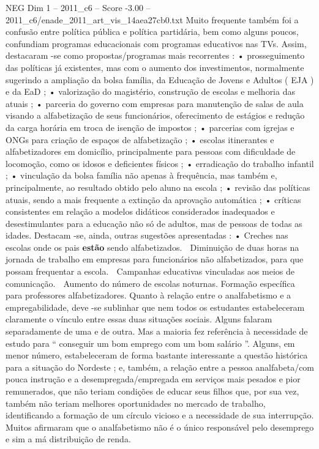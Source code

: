 \begin{textsample}{NEG Dim 1 – 2011\_c6 – Score -3.00 – 2011\_c6/enade\_2011\_art\_vis\_14aea27cb0.txt}
Muito frequente também foi a confusão entre política pública e política partidária, bem como alguns poucos, confundiam programas educacionais com programas educativos nas TVs.
Assim, destacaram -se como propostas/programas mais recorrentes : • prosseguimento das políticas já existentes, mas com o aumento dos investimentos, normalmente sugerindo a ampliação da bolsa família, da Educação de Jovens e Adultos ( EJA ) e da EaD ; • valorização do magistério, construção de escolas e melhoria das atuais ; • parceria do governo com empresas para manutenção de salas de aula visando a alfabetização de seus funcionários, oferecimento de estágios e redução da carga horária em troca de isenção de impostos ; • parcerias com igrejas e ONGs para criação de espaços de alfabetização ; • escolas itinerantes e alfabetizadores em domicílio, principalmente para pessoas com dificuldade de locomoção, como os idosos e deficientes físicos ; • erradicação do trabalho infantil ; • vinculação da bolsa família não apenas à frequência, mas também e, principalmente, ao resultado obtido pelo aluno na escola ; • revisão das políticas atuais, sendo a mais frequente a extinção da aprovação automática ; • críticas consistentes em relação a modelos didáticos considerados inadequados e desestimulantes para a educação não só de adultos, mas de pessoas de todas as idades.
Destacam -se, ainda, outras sugestões apresentadas : • Creches nas escolas onde os pais \textbf{estão} sendo alfabetizados.  Diminuição de duas horas na jornada de trabalho em empresas para funcionários não alfabetizados, para que possam frequentar a escola.  Campanhas educativas vinculadas aos meios de comunicação.  Aumento do número de escolas noturnas.
Formação específica para professores alfabetizadores.
Quanto à relação entre o analfabetismo e a empregabilidade, deve -se sublinhar que nem todos os estudantes estabeleceram claramente o vínculo entre essas duas situações sociais.
Alguns falaram separadamente de uma e de outra.
Mas a maioria fez referência à necessidade de estudo para “ conseguir um bom emprego com um bom salário ”.
Alguns, em menor número, estabeleceram de forma bastante interessante a questão histórica para a situação do Nordeste ; e, também, a relação entre a pessoa analfabeta/com pouca instrução e a desempregada/empregada em serviços mais pesados e pior remunerados, que não teriam condições de educar seus filhos que, por sua vez, também não teriam melhores oportunidades no mercado de trabalho, identificando a formação de um círculo vicioso e a necessidade de sua interrupção.
Muitos afirmaram que o analfabetismo não é o único responsável pelo desemprego e sim a má distribuição de renda.

\end{textsample}

